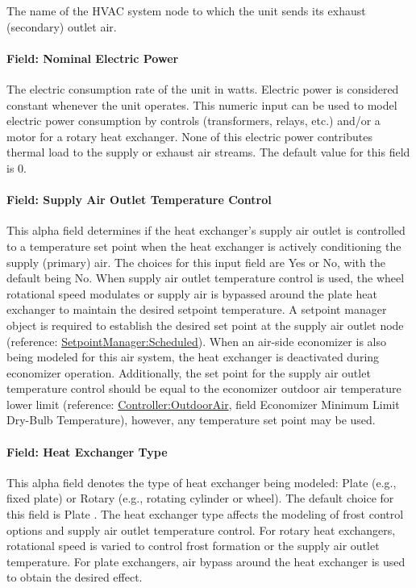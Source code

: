 The name of the HVAC system node to which the unit sends its exhaust (secondary) outlet air.

\paragraph{Field: Nominal Electric Power}\label{field-nominal-electric-power-1}

The electric consumption rate of the unit in watts. Electric power is considered constant whenever the unit operates. This numeric input can be used to model electric power consumption by controls (transformers, relays, etc.) and/or a motor for a rotary heat exchanger. None of this electric power contributes thermal load to the supply or exhaust air streams. The default value for this field is 0.

\paragraph{Field: Supply Air Outlet Temperature Control}\label{field-supply-air-outlet-temperature-control}

This alpha field determines if the heat exchanger's supply air outlet is controlled to a temperature set point when the heat exchanger is actively conditioning the supply (primary) air. The choices for this input field are Yes or No, with the default being No. When supply air outlet temperature control is used, the wheel rotational speed modulates or supply air is bypassed around the plate heat exchanger to maintain the desired setpoint temperature. A setpoint manager object is required to establish the desired set point at the supply air outlet node (reference: \hyperref[setpointmanagerscheduled]{SetpointManager:Scheduled}). When an air-side economizer is also being modeled for this air system, the heat exchanger is deactivated during economizer operation. Additionally, the set point for the supply air outlet temperature control should be equal to the economizer outdoor air temperature lower limit (reference: \hyperref[controlleroutdoorair]{Controller:OutdoorAir}, field Economizer Minimum Limit Dry-Bulb Temperature), however, any temperature set point may be used.

\paragraph{Field: Heat Exchanger Type}\label{field-heat-exchanger-type}

This alpha field denotes the type of heat exchanger being modeled: Plate (e.g., fixed plate) or Rotary (e.g., rotating cylinder or wheel). The default choice for this field is Plate . The heat exchanger type affects the modeling of frost control options and supply air outlet temperature control. For rotary heat exchangers, rotational speed is varied to control frost formation or the supply air outlet temperature. For plate exchangers, air bypass around the heat exchanger is used to obtain the desired effect.

